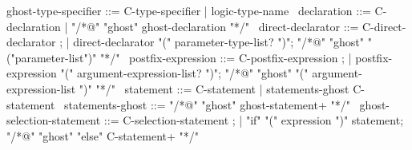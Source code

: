 \begin{syntax}

  ghost-type-specifier ::= C-type-specifier | {logic-type-name} \
  declaration ::= C-declaration | "/*@" "ghost" ghost-declaration "*/" \
  direct-declarator ::= C-direct-declarator ;
    | direct-declarator "(" parameter-type-list? ")";
        {"/*@" "ghost" "("parameter-list")" "*/"} \
  postfix-expression ::= C-postfix-expression ;
    | postfix-expression "(" argument-expression-list? ")";
    {"/*@" "ghost" "(" argument-expression-list ")" "*/"} \
  statement ::= C-statement | statements-ghost C-statement \
  statements-ghost ::= "/*@" "ghost" ghost-statement+ "*/" \
  ghost-selection-statement ::= C-selection-statement ;
    | "if" "(" expression ")" statement;
      {"/*@" "ghost" "else" C-statement+ "*/"} \

\end{syntax}

